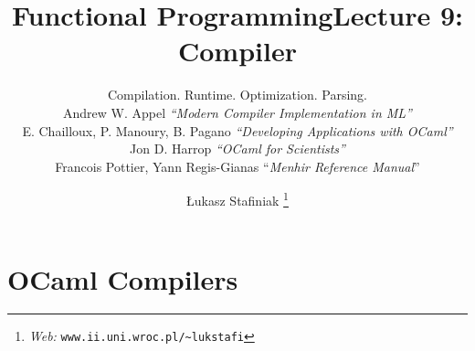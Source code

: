 \documentclass{beamer}
\newcommand{\tmem}[1]{{\em #1\/}}
\newcommand{\tmfnhomepage}[1]{\thanks{\textit{Web:} \texttt{#1}}}
\begin{document}
\title{Functional Programming}

\author{
  {\L}ukasz Stafiniak
  \tmfnhomepage{www.ii.uni.wroc.pl/\~{}lukstafi}
}


\maketitle

\title{Lecture 9: Compiler}

\subtitle{Compilation. Runtime. Optimization. Parsing.\\
{\small{Andrew W. Appel {\tmem{``Modern Compiler Implementation in ML''}}\\
E. Chailloux, P. Manoury, B. Pagano {\tmem{``Developing Applications with
OCaml''}}\\
Jon D. Harrop {\tmem{``OCaml for Scientists''}}\\
Francois Pottier, Yann Regis-Gianas ``{\tmem{Menhir Reference Manual}}''}}}

\maketitle

{}

\section{OCaml Compilers}
\end{document}

